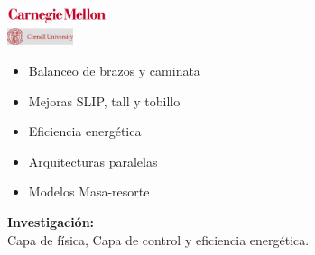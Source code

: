 {\begin{frame}
\begin{columns}[T]
\begin{column}{5.0cm}
{\begin{center}
            \includegraphics[height=0.5cm]{../images/CMULogo.png}\\
            \includegraphics[height=0.5cm]{../images/CornellULogo.png}
            \begin{itemize}
            \item Balanceo de brazos y caminata
            \item Mejoras SLIP, tall y tobillo
            \item Eficiencia energ\'etica
            \item Arquitecturas paralelas
            \item Modelos Masa-resorte
            \end{itemize}
            \textbf{Investigaci\'on:}\\
            Capa de f\'isica, Capa de control y eficiencia energ\'etica.
          \end{center}
        }
\end{column}
\end{columns}
\end{frame}}
